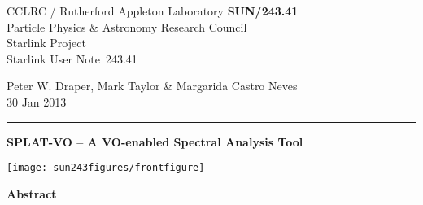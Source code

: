\documentclass[twoside,11pt]{article}
\newcommand{\stardoccategory}  {Starlink User Note}
\newcommand{\stardocinitials}  {SUN}
\newcommand{\stardocnumber}    {243.41}
\newcommand{\stardocauthors}   {Peter W. Draper, Mark Taylor \& Margarida Castro Neves}
\newcommand{\stardocdate}      {30 Jan 2013}
\newcommand{\stardoctitle}     {SPLAT-VO -- A VO-enabled Spectral Analysis Tool}
\newcommand{\stardocname}{\stardocinitials /\stardocnumber}
\newenvironment{latexonly}{}{}
\renewcommand{\_}{\texttt{\symbol{95}}}
\begin{document}
\thispagestyle{empty}

\begin{latexonly}
   CCLRC / Rutherford Appleton Laboratory \hfill \textbf{\stardocname}\\
   {\large Particle Physics \& Astronomy Research Council}\\
   {\large Starlink Project\\}
   {\large \stardoccategory\ \stardocnumber}
   \begin{flushright}
   \stardocauthors\\
   \stardocdate
   \end{flushright}
   \vspace{-4mm}
   \rule{\textwidth}{0.5mm}
   \vspace{5mm}
   \begin{center}
      {\LARGE\textbf{\stardoctitle \\ [2.5ex]}}
   \end{center}
   \vspace{5mm}

\begin{center}
\texttt{[image: sun243\_figures/frontfigure]}
\end{center}

   \begin{center}
      {\Large\textbf{Abstract}}
   \end{center}
\end{latexonly}
\end{document}
